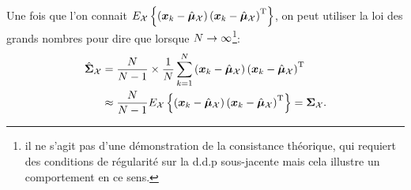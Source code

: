 \begin{remark}
%
%
%
%
%
\end{remark}


\begin{remark}
Une fois que l'on connait $E_{\mathcal{X}}\left\{\left(\boldsymbol{x}_k-\hat{\boldsymbol{\mu}}_{\mathcal{X}}\right)\left(\boldsymbol{x}_k-\hat{\boldsymbol{\mu}}_{\mathcal{X}}\right)^{\mathrm{T}}\right\}$, on peut utiliser la loi des grands nombres pour dire que lorsque $N\to\infty$\footnote{il ne s'agit pas d'une démonstration de la consistance théorique, qui requiert des conditions de régularité sur la d.d.p sous-jacente mais cela illustre un comportement en ce sens.}:
  \begin{align*}
    \hat{\boldsymbol{\Sigma}}_{\mathcal{X}} &= \frac{N}{N-1}\times\frac{1}{N} \sum_{k=1}^N\left(\boldsymbol{x}_k-\hat{\boldsymbol{\mu}}_{\mathcal{X}}\right)\left(\boldsymbol{x}_k-\hat{\boldsymbol{\mu}}_{\mathcal{X}}\right)^{\mathrm{T}} \\
    & \approx  \frac{N}{N-1} E_{\mathcal{X}}\left\{\left(\boldsymbol{x}_k-\hat{\boldsymbol{\mu}}_{\mathcal{X}}\right)\left(\boldsymbol{x}_k-\hat{\boldsymbol{\mu}}_{\mathcal{X}}\right)^{\mathrm{T}}\right\}  = \boldsymbol{\Sigma}_{\mathcal{X}}.
\end{align*}
\end{remark}


